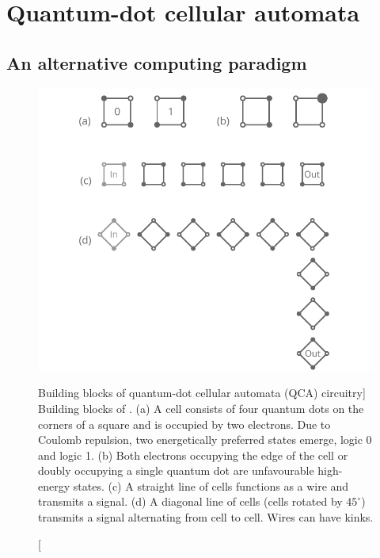 \chapter{\label{ch:QCA_intro}Quantum-dot cellular automata}
\graphicspath{{../gfx/chapter01/}}


\section{\label{sec:an_alternative_computing_paradigm}An alternative computing paradigm}

\begin{figure}
  \center
  \includegraphics{intro_qca}
  \caption
[Building blocks of quantum-dot cellular automata (QCA) circuitry]
{
\label{fig:intro_qca}
Building blocks of . (a) A  cell consists of four quantum
dots on the corners of a square and is occupied by two electrons. Due to Coulomb
repulsion, two energetically preferred states emerge, logic 0 and logic 1. (b)
Both electrons occupying the edge of the cell or doubly occupying a single
quantum dot are unfavourable high-energy states. (c) A straight line of cells
functions as a wire and transmits a signal. (d) A diagonal line of cells (cells
rotated by $45^{\circ}$) transmits a signal alternating from cell to cell. Wires
can have kinks.
}
\end{figure}
%

